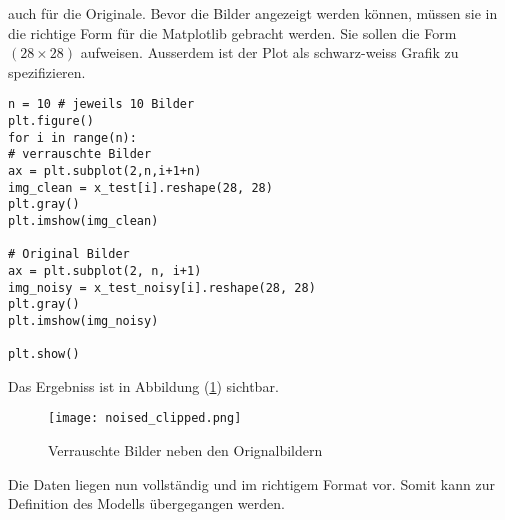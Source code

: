 auch für die Originale.
Bevor die Bilder angezeigt werden können, müssen sie in die richtige Form für
die Matplotlib gebracht werden. Sie sollen die Form $(28 \times 28)$ aufweisen.
Ausserdem ist der Plot als schwarz-weiss Grafik zu spezifizieren.
\begin{verbatim}
n = 10 # jeweils 10 Bilder
plt.figure()
for i in range(n):
# verrauschte Bilder
ax = plt.subplot(2,n,i+1+n)
img_clean = x_test[i].reshape(28, 28)
plt.gray()
plt.imshow(img_clean)

# Original Bilder
ax = plt.subplot(2, n, i+1)
img_noisy = x_test_noisy[i].reshape(28, 28)
plt.gray()
plt.imshow(img_noisy)

plt.show()
\end{verbatim}

Das Ergebniss ist in Abbildung (\ref{fig:noisy_clean_mnist}) sichtbar.
\begin{figure}[h!]
  \centering
  \texttt{[image: noised\_clipped.png]}
  \caption{Verrauschte Bilder neben den Orignalbildern}
  \label{fig:noisy_clean_mnist}
\end{figure}
\para{}
Die Daten liegen nun vollständig und im richtigem Format vor.
Somit kann zur Definition des Modells übergegangen werden.

